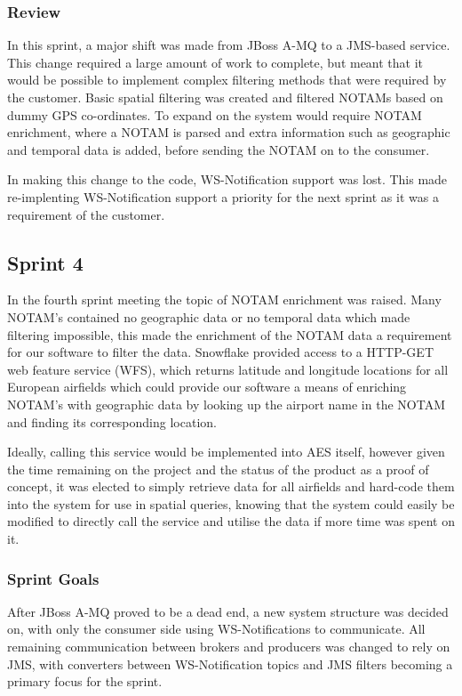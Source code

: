 \documentclass[a4paper, 12pt, twoside]{article}
\begin{document}
\subsubsection{Review}

In this sprint, a major shift was made from JBoss A-MQ to a JMS-based service. This change required a large amount of work to complete, but meant that it would be possible to implement complex filtering methods that were required by the customer. Basic spatial filtering was created and filtered NOTAMs based on dummy GPS co-ordinates. To expand on the system would require NOTAM enrichment, where a NOTAM is parsed and extra information such as geographic and temporal data is added, before sending the NOTAM on to the consumer.

In making this change to the code, WS-Notification support was lost. This made re-implenting WS-Notification support a priority for the next sprint as it was a requirement of the customer.

\subsection{Sprint 4}
\label{sec:impl_sprint_4}

In the fourth sprint meeting the topic of NOTAM enrichment was raised. Many NOTAM's contained no geographic data or no temporal data which made filtering impossible, this made the enrichment of the NOTAM data a requirement for our software to filter the data. Snowflake provided access to a HTTP-GET web feature service (WFS), which returns latitude and longitude locations for all European airfields which could provide our software a means of enriching NOTAM's with geographic data by looking up the airport name in the NOTAM and finding its corresponding location.

Ideally, calling this service would be implemented into AES itself, however given the time remaining on the project and the status of the product as a proof of concept, it was elected to simply retrieve data for all airfields and hard-code them into the system for use in spatial queries, knowing that the system could easily be modified to directly call the service and utilise the data if more time was spent on it.

\subsubsection{Sprint Goals}

After JBoss A-MQ proved to be a dead end, a new system structure was decided on, with only the consumer side using WS-Notifications to communicate. All remaining communication between brokers and producers was changed to rely on JMS, with converters between WS-Notification topics and JMS filters becoming a primary focus for the sprint.
\end{document}
